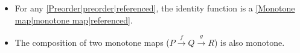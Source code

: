 
\begin{itemize}
    \item For any \ref{Preorder|preorder|referenced}, the identity function is a \ref{Monotone map|monotone map|referenced}.
    \item The composition of two monotone maps ($P \xrightarrow{f} Q \xrightarrow{g} R$) is also monotone.
  \end{itemize}